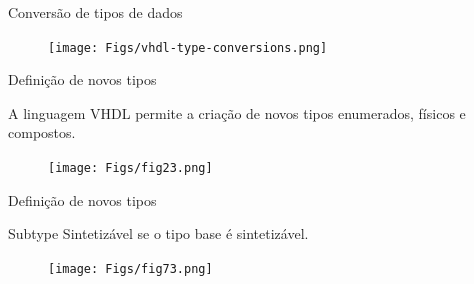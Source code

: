 \documentclass[aspectratio=169]{beamer}
\begin{document}
\begin{frame}{Conversão de tipos de dados}
	\justifying
	
	
	
	\begin{figure}[h]
		\centering
		\texttt{[image: Figs/vhdl-type-conversions.png]}
	\end{figure}	
	
\end{frame}



\begin{frame}{Definição de novos tipos}
	\justifying
	
	\begin{block}{}
	\justifying
	A linguagem VHDL permite a criação de novos tipos enumerados, físicos e compostos.
	\end{block}		
	
	\begin{figure}[h]
		\centering
		\texttt{[image: Figs/fig23.png]}
	\end{figure}
	
%	
	
\end{frame}


\begin{frame}{Definição de novos tipos}
	\justifying
%	
%	
	
	\begin{block}{Subtype}
		\justifying
		Sintetizável se o tipo base é sintetizável.
	\end{block}		
	
	\begin{figure}[h]
		\centering
		\texttt{[image: Figs/fig73.png]}
	\end{figure}
	
\end{frame}
\end{document}
